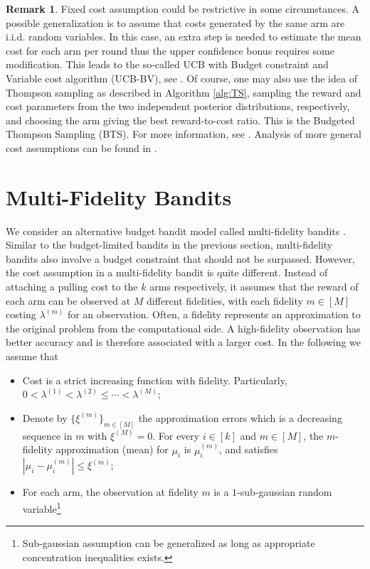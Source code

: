 \documentclass[letterpaper,11pt,openright,openany]{book}
\numberwithin{equation}{section}
\theoremstyle{plain}
\theoremstyle{definition}
\newtheorem{Rem}[Th]{Remark}
\begin{document}
\begin{Rem}
Fixed cost assumption could be restrictive in some circumstances. A possible generalization is to assume that costs generated by the same arm are i.i.d. random variables. In this case, an extra step is needed to estimate the mean cost for each arm per round thus the upper confidence bonus requires some modification. This leads to the so-called UCB with Budget constraint and Variable cost algorithm (UCB-BV),  see \cite{ding2013multi}. Of course, one may also use the idea of Thompson sampling as described in Algorithm \ref{alg:TS}, sampling the reward and cost parameters from the two independent posterior distributions, respectively, and choosing the arm giving the best reward-to-cost ratio. This is the Budgeted Thompson Sampling (BTS). For more information, see \cite{xia2015thompson}. Analysis of more general cost assumptions can be found in \cite{cayci2020budget}.  
\end{Rem}


\section{Multi-Fidelity Bandits}
We consider an alternative budget bandit model called multi-fidelity bandits \cite{kandasamy2016multi}.
Similar to the budget-limited bandits in the previous section, multi-fidelity bandits also involve a budget constraint that should not be surpassed.
However, the cost assumption in a multi-fidelity bandit is quite different.  
Instead of attaching a pulling cost to the $k$ arms respectively, it assumes that the reward of each arm can be observed at $M$ different fidelities, with each fidelity $m\in [M]$ costing $\lambda^{(m)}$ for an observation. 
Often, a fidelity represents an approximation to the original problem from the computational side. 
A high-fidelity observation has better accuracy and is therefore associated with a larger cost. 
In the following we assume that 
\begin{itemize}
\item Cost is a strict increasing function with fidelity. Particularly, $0<\lambda^{(1)}<\lambda^{(2)}\leq\cdots<\lambda^{(M)}$;
\item Denote by $\{\xi^{(m)}\}_{m\in [M]}$ the approximation errors which is a decreasing sequence in $m$ with $\xi^{(M)}=0$. 
For every $i\in [k]$ and $m\in [M]$, the $m$-fidelity approximation (mean) for $\mu_i$ is $\mu_i^{(m)}$, and satisfies  $|\mu_i-\mu_i^{(m)}|\leq\xi^{(m)}$;
\item For each arm, the observation at fidelity $m$ is a $1$-sub-gaussian random variable\footnote{Sub-gaussian assumption can be generalized as long as appropriate concentration inequalities exists. }
\end{itemize}
\end{document}
